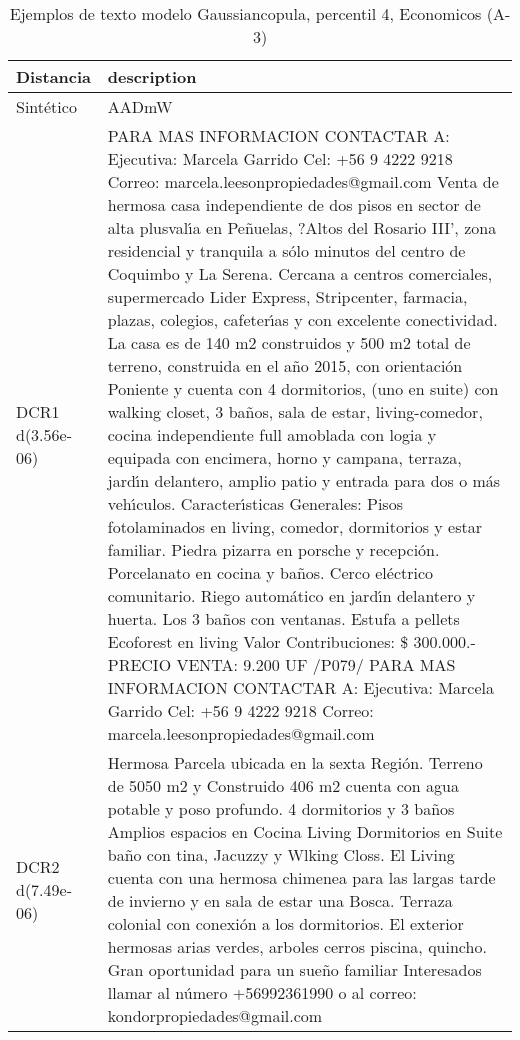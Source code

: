 \begin{table}[H]
\centering
\fontsize{10}{14}\selectfont
\caption{Ejemplos de texto modelo Gaussiancopula, percentil 4, Economicos (A-3)}
\label{table-example-economicos-a-3-gaussiancopula-4p-text}
\begin{tabular}{|l|m{35em}|}
\hline
\rowcolor[gray]{0.8}
Distancia & description \\
\hline Sintético & AADmW \\
\hline DCR1 d(3.56e-06) & PARA MAS INFORMACION CONTACTAR A:  Ejecutiva: Marcela Garrido  Cel: +56 9 4222 9218 Correo: marcela.leesonpropiedades@gmail.com   Venta de hermosa casa independiente de dos pisos en sector de alta plusval{\'\i}a en Pe\~nuelas, ?Altos del Rosario III', zona residencial y tranquila a s\'olo minutos del centro de Coquimbo y La Serena. Cercana a centros comerciales, supermercado Lider Express, Stripcenter, farmacia, plazas, colegios, cafeter{\'\i}as y con excelente conectividad.  La casa es de 140 m2 construidos y 500 m2 total de terreno, construida en el a\~no 2015, con orientaci\'on Poniente y cuenta con 4 dormitorios, (uno en suite) con walking closet, 3 ba\~nos, sala de estar, living-comedor, cocina independiente full amoblada con logia y equipada con encimera, horno y campana, terraza, jard{\'\i}n delantero, amplio patio y entrada para dos o m\'as veh{\'\i}culos.  Caracter{\'\i}sticas Generales:  Pisos fotolaminados en living, comedor, dormitorios y estar familiar. Piedra pizarra en porsche y recepci\'on. Porcelanato en cocina y ba\~nos. Cerco el\'ectrico comunitario. Riego autom\'atico en jard{\'\i}n delantero y huerta. Los 3 ba\~nos con ventanas. Estufa a pellets Ecoforest en living Valor Contribuciones: \$ 300.000.-  PRECIO VENTA: 9.200 UF  /P079/  PARA MAS INFORMACION CONTACTAR A:  Ejecutiva: Marcela Garrido  Cel: +56 9 4222 9218 Correo: marcela.leesonpropiedades@gmail.com \\
\hline DCR2 d(7.49e-06) & Hermosa Parcela  ubicada en la sexta Regi\'on. Terreno de 5050 m2 y Construido 406 m2 cuenta con agua potable y poso profundo.
 4 dormitorios y 3 ba\~nos Amplios espacios en Cocina Living Dormitorios en Suite  ba\~no con tina, Jacuzzy  y Wlking Closs. El Living cuenta con una hermosa chimenea  para las largas tarde de invierno y en sala de estar una Bosca. Terraza colonial con conexi\'on a los dormitorios.  El exterior hermosas arias verdes, arboles cerros piscina, quincho.  Gran oportunidad para un sue\~no familiar  
Interesados llamar al n\'umero +56992361990 o al correo: kondorpropiedades@gmail.com \\
\hline
\end{tabular}
\end{table}
